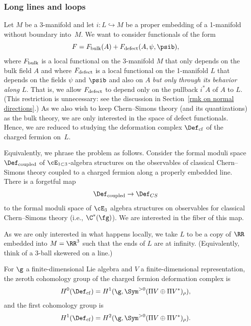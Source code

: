 \documentclass[10pt]{amsart}
\begin{document}
\subsubsection{Long lines and loops}

Let $M$ be a 3-manifold and let $i : L \hookrightarrow M$ be a proper embedding of a 1-manifold without boundary into~$M$.
We want to consider functionals of the form
\[
F = F_{\rm bulk}(A) + F_{\rm defect}(A,\psi,\psib),
\]
where $F_{\rm bulk}$ is a local functional on the 3-manifold $M$ that only depends on the bulk field $A$ 
and where $F_{\rm defect}$ is a local functional on the 1-manifold $L$ that depends on the fields $\psi$ and $\psib$ and also on $A$ {\em but only through its behavior along $L$}.
That is, we allow $F_{\rm defect}$ to depend only on the pullback $i^*A$ of $A$ to $L$.
(This restriction is unnecessary: see the discussion in Section~\ref{rmk on normal directions}.)
As we also wish to keep Chern--Simons theory (and its quantizations) as the bulk theory,
we are only interested in the space of defect functionals.
Hence, we are reduced to studying the deformation complex $\Def_{\rm cf}$ of the charged fermion on~$L$.

Equivalently, we phrase the problem as follows.
Consider the formal moduli space $\Def_{\rm coupled}$ of $\cE_{1 \subset 3}$-algebra structures on the observables of classical Chern--Simons theory coupled to a charged fermion along a properly embedded line.
There is a forgetful map
\[
\Def_{\rm coupled} \to \Def_{CS}
\]
to the formal moduli space of $\cE_3$ algebra structures on observables for classical Chern--Simons theory (i.e., $\C^*(\fg)$).
We are interested in the fiber of this map.

As we are only interested in what happens locally, 
we take $L$ to be a copy of $\RR$ embedded into $M = \RR^3$ such that the ends of $L$ are at infinity.
(Equivalently, think of a 3-ball skewered on a line.)

\begin{lmm}
\label{lmm: coupled def cplx}
For $\g$ a finite-dimensional Lie algebra and $V$ a finite-dimensional representation,
the zeroth cohomology group of the charged fermion deformation complex is
\[
H^0(\Def_{\rm cf}) = H^1(\g,\Sym^{>0}(\Pi V \oplus \Pi V^*)_\rho ),
\]
and the first cohomology group is
\[
H^1(\Def_{\rm cf}) = H^2(\g,\Sym^{>0}(\Pi V \oplus \Pi V^*)_\rho).
\]
\end{lmm}

\end{document}
